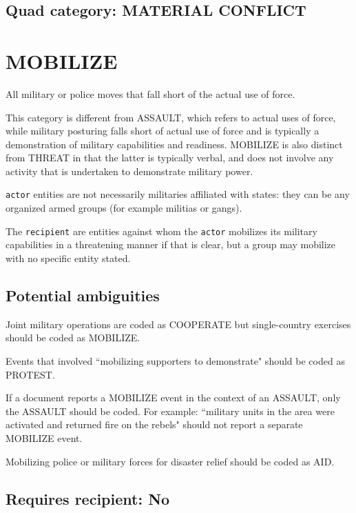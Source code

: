 \documentclass[11pt]{report}
\newcommand{\plcat}[1]{\textsf{#1}}
\newcommand{\txt}[1]{\texttt{#1}}
\begin{document}
\subsection{Quad category: MATERIAL CONFLICT}

\newpage

\section{MOBILIZE}

All military or police moves that fall short of the actual use of force.

This category is different from \plcat{ASSAULT}, which refers to actual uses of force, while military posturing falls short of actual use of force and is typically a demonstration of military capabilities and readiness. \plcat{MOBILIZE} is also distinct from \plcat{THREAT} in that the latter is typically verbal, and does not involve any activity that is undertaken to demonstrate military power.

\txt{actor} entities  are not necessarily militaries affiliated with states: they can be any organized armed groups (for example militias or gangs).

The \txt{recipient} are entities against whom the \txt{actor} mobilizes its military capabilities in a threatening manner if that is clear, but a group may mobilize with no specific entity stated.

\subsection{Potential ambiguities}

Joint military operations are coded as \plcat{COOPERATE} but single-country exercises should be coded as \plcat{MOBILIZE}.

Events that involved ``mobilizing supporters to demonstrate" should be coded as \plcat{PROTEST}.

If a document reports a \plcat{MOBILIZE} event in the context of an \plcat{ASSAULT}, only the \plcat{ASSAULT} should be coded. For example: ``military units in the area were activated and returned fire on the rebels" should not report a separate \plcat{MOBILIZE} event.

Mobilizing police or military forces for disaster relief should be coded as \plcat{AID}.

\subsection{Requires recipient: No}
\end{document}
